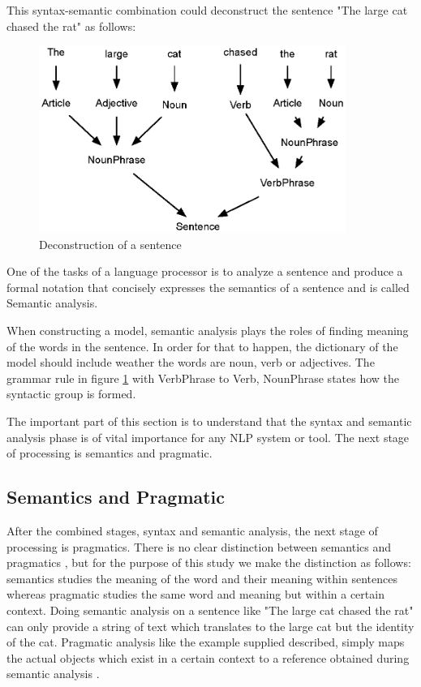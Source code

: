 This syntax-semantic combination could deconstruct the sentence "The large cat chased the rat" as follows:
\begin{figure}[htbp]
\centering
\includegraphics[width=10cm]{./figures/sen.eps}
\caption{Deconstruction of a sentence}
\label{fig:sentence}
\end{figure}
One of the tasks of a language processor is to analyze a sentence and produce a formal notation that concisely expresses the semantics of a sentence and is called Semantic analysis.

When constructing a model, semantic analysis plays the roles of finding meaning of the words in the sentence. In order for that to happen, the dictionary of the model should include weather the words are noun, verb or adjectives. The grammar rule in figure \ref{fig:sentence} with VerbPhrase to Verb, NounPhrase states how the syntactic group is formed.

The important part of this section is to understand that the syntax and semantic analysis phase is of vital importance for any NLP system or tool. The next stage of processing is semantics and pragmatic.
\subsection{Semantics and Pragmatic}

After the combined stages, syntax and semantic analysis, the next stage of processing is pragmatics. There is no clear distinction between semantics and pragmatics \cite{Stern2004}, but for the purpose of this study we make the distinction as follows: semantics studies the meaning of the word and their meaning within sentences whereas pragmatic studies the same word and meaning but within a certain context. Doing semantic analysis on a sentence like "The large cat chased the rat"  can only provide a string of text which translates to the large cat but the identity of the cat. Pragmatic analysis like the example supplied described, simply maps the actual objects which exist in a certain context to a reference obtained during semantic analysis \cite{russell2016artificial}.

